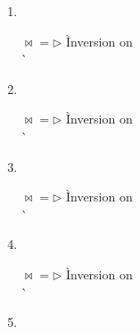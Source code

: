 \begin{enumerate}
\begin{enumerate}
  \item {} \ \\

    \begin{tabbing}
    $\bowtie{} = \rhd$
      \` Inversion on  \\
      \`  \\
    \end{tabbing}

  \item {} \ \\

    \begin{tabbing}
    $\bowtie{} = \rhd$
      \` Inversion on  \\
      \`  \\
    \end{tabbing}

  \item {} \ \\

    \begin{tabbing}
    $\bowtie{} = \rhd$
      \` Inversion on  \\
      \`  \\
    \end{tabbing}

  \item {} \ \\

    \begin{tabbing}
    $\bowtie{} = \rhd$
      \` Inversion on  \\
      \`  \\
    \end{tabbing}

  \item {} \ \\


\end{enumerate}
\end{enumerate}
